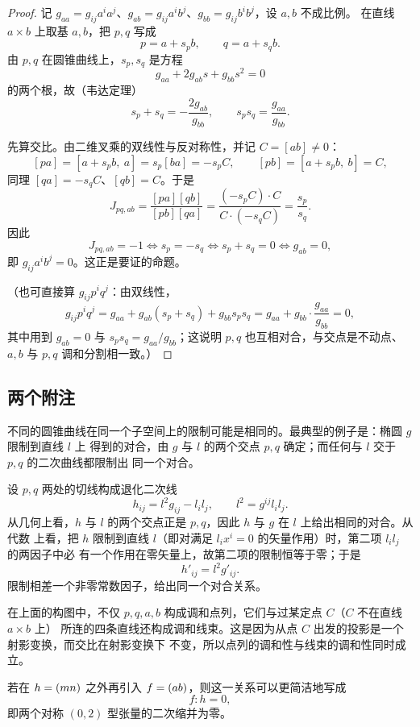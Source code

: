 \begin{proof}
记 $g_{aa}=g_{ij}a^ia^j$、$g_{ab}=g_{ij}a^ib^j$、$g_{bb}=g_{ij}b^ib^j$，设 $a,b$ 不成比例。
在直线 $a\times b$ 上取基 $a,b$，把 $p,q$ 写成
\[
p=a+s_pb,\qquad q=a+s_qb .
\]
由 $p,q$ 在圆锥曲线上，$s_p,s_q$ 是方程
\[
g_{aa}+2g_{ab}s+g_{bb}s^2=0
\]
的两个根，故（韦达定理）
\[
s_p+s_q=-\frac{2g_{ab}}{g_{bb}},\qquad s_ps_q=\frac{g_{aa}}{g_{bb}} .
\]

先算交比。由二维叉乘的双线性与反对称性，并记 $C=[ab]\ne0$：
\[
[pa]=[a+s_pb,\ a]=s_p[b a]=-s_pC,\qquad
[pb]=[a+s_pb,\ b]=C,
\]
同理 $[qa]=-s_qC$、$[qb]=C$。于是
\[
J_{pq,ab}=\frac{[pa][qb]}{[pb][qa]}
=\frac{(-s_pC)\cdot C}{C\cdot(-s_qC)}=\frac{s_p}{s_q}.
\]
因此
\[
J_{pq,ab}=-1 \iff s_p=-s_q \iff s_p+s_q=0 \iff g_{ab}=0,
\]
即 $g_{ij}a^ib^j=0$。这正是要证的命题。

（也可直接算 $g_{ij}p^iq^j$：由双线性，
\[
g_{ij}p^iq^j=g_{aa}+g_{ab}(s_p+s_q)+g_{bb}s_ps_q
=g_{aa}+g_{bb}\cdot\frac{g_{aa}}{g_{bb}}=0,
\]
其中用到 $g_{ab}=0$ 与 $s_ps_q=g_{aa}/g_{bb}$；这说明 $p,q$ 也互相对合，与交点是不动点、
$a,b$ 与 $p,q$ 调和分割相一致。）
\end{proof}

\subsection{两个附注}

\begin{remark}[不同的圆锥曲线可以给出相同的限制对合]
不同的圆锥曲线在同一个子空间上的限制可能是相同的。最典型的例子是：椭圆 $g$ 限制到直线 $l$ 上
得到的对合，由 $g$ 与 $l$ 的两个交点 $p,q$ 确定；而任何与 $l$ 交于 $p,q$ 的二次曲线都限制出
同一个对合。

设 $p,q$ 两处的切线构成退化二次线
\[
h_{ij}=l^2g_{ij}-l_il_j,\qquad l^2=g^{ij}l_il_j .
\]
从几何上看，$h$ 与 $l$ 的两个交点正是 $p,q$，因此 $h$ 与 $g$ 在 $l$ 上给出相同的对合。从代数
上看，把 $h$ 限制到直线 $l$（即对满足 $l_ix^i=0$ 的矢量作用）时，第二项 $l_il_j$ 的两因子中必
有一个作用在零矢量上，故第二项的限制恒等于零；于是
\[
h'_{ij}=l^2g'_{ij} .
\]
限制相差一个非零常数因子，给出同一个对合关系。
\end{remark}

\begin{remark}[调和线束]
在上面的构图中，不仅 $p,q,a,b$ 构成调和点列，它们与过某定点 $C$（$C$ 不在直线 $a\times b$ 上）
所连的四条直线还构成调和线束。这是因为从点 $C$ 出发的投影是一个射影变换，而交比在射影变换下
不变，所以点列的调和性与线束的调和性同时成立。

若在 $h=(mn)$ 之外再引入 $f=(ab)$，则这一关系可以更简洁地写成
\[
f:h=0 ,
\]
即两个对称 $(0,2)$ 型张量的二次缩并为零。
\end{remark}

